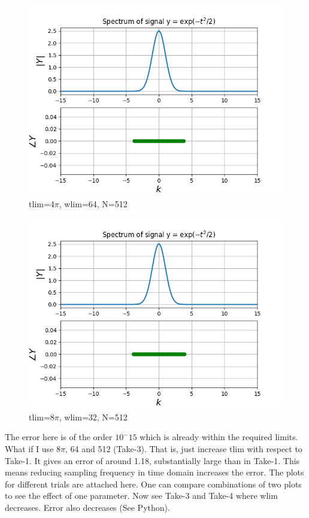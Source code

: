 \documentclass[11pt, a4paper]{article}
\begin{document}
\begin{figure}[!tbh]
   	\centering
  \includegraphics[scale=0.5]{a8_8.png} 
    \caption{tlim=4$\pi$, wlim=64, N=512} 	
   \end{figure} 

\begin{figure}[!tbh]
   	\centering
  \includegraphics[scale=0.5]{a8_9.png} 
    \caption{tlim=8$\pi$, wlim=32, N=512} 	
   \end{figure} 
   
The error here is of the order $10^-{15}$ which is already within the required limits. What if I use 8$\pi$, 64 and 512 (Take-3). That is, just increase tlim with respect to Take-1. It gives an error of around 1.18, substantially large than in Take-1. This means reducing sampling frequency in time domain increases the error. The plots for different trials are attached here. One can compare combinations of two plots to see the effect of one parameter. Now see Take-3 and Take-4 where wlim decreases. Error also decreases (See Python).  
\end{document}

